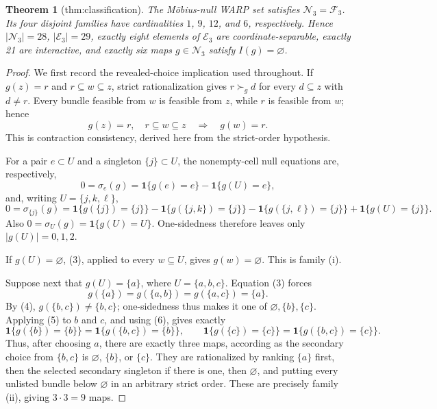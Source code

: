 \documentclass{article}
\newtheorem{theorem}{Theorem}
\begin{document}
\begin{theorem}[thm:classification]\label{thm:classification}
The Möbius-null WARP set satisfies \(\mathcal N_3=\mathcal F_3\). Its four disjoint families have cardinalities \(1\), \(9\), \(12\), and \(6\), respectively. Hence \(|\mathcal N_3|=28\), \(|\mathcal E_3|=29\), exactly eight elements of \(\mathcal E_3\) are coordinate-separable, exactly 21 are interactive, and exactly six maps \(g\in\mathcal N_3\) satisfy \(I(g)=\varnothing\).
\end{theorem}
\begin{proof}
We first record the revealed-choice implication used throughout.  If \(g(z)=r\) and \(r\subseteq w\subseteq z\), strict rationalization gives \(r\succ_g d\) for every \(d\subseteq z\) with \(d\ne r\).  Every bundle feasible from \(w\) is feasible from \(z\), while \(r\) is feasible from \(w\); hence
\[
g(z)=r,\quad r\subseteq w\subseteq z
\quad\Longrightarrow\quad g(w)=r. \tag{3}
\]
This is contraction consistency, derived here from the strict-order hypothesis.

For a pair \(e\subset U\) and a singleton \(\{j\}\subset U\), the nonempty-cell null equations are, respectively,
\[
0=\sigma_e(g)=\mathbf 1\{g(e)=e\}-\mathbf 1\{g(U)=e\}, \tag{4}
\]
and, writing \(U=\{j,k,\ell\}\),
\[
0=\sigma_{\{j\}}(g)
=\mathbf 1\{g(\{j\})=\{j\}\}
-\mathbf 1\{g(\{j,k\})=\{j\}\}
-\mathbf 1\{g(\{j,\ell\})=\{j\}\}
+\mathbf 1\{g(U)=\{j\}\}. \tag{5}
\]
Also \(0=\sigma_U(g)=\mathbf 1\{g(U)=U\}\).  One-sidedness therefore leaves only \(|g(U)|=0,1,2\).

If \(g(U)=\varnothing\), (3), applied to every \(w\subseteq U\), gives \(g(w)=\varnothing\).  This is family (i).

Suppose next that \(g(U)=\{a\}\), where \(U=\{a,b,c\}\).  Equation (3) forces
\[
g(\{a\})=g(\{a,b\})=g(\{a,c\})=\{a\}. \tag{6}
\]
By (4), \(g(\{b,c\})\ne\{b,c\}\); one-sidedness thus makes it one of \(\varnothing,\{b\},\{c\}\).  Applying (5) to \(b\) and \(c\), and using (6), gives exactly
\[
\mathbf 1\{g(\{b\})=\{b\}\}
=\mathbf 1\{g(\{b,c\})=\{b\}\},
\qquad
\mathbf 1\{g(\{c\})=\{c\}\}
=\mathbf 1\{g(\{b,c\})=\{c\}\}. \tag{7}
\]
Thus, after choosing \(a\), there are exactly three maps, according as the secondary choice from \(\{b,c\}\) is \(\varnothing\), \(\{b\}\), or \(\{c\}\).  They are rationalized by ranking \(\{a\}\) first, then the selected secondary singleton if there is one, then \(\varnothing\), and putting every unlisted bundle below \(\varnothing\) in an arbitrary strict order.  These are precisely family (ii), giving \(3\cdot3=9\) maps.


\end{proof}
\end{document}
